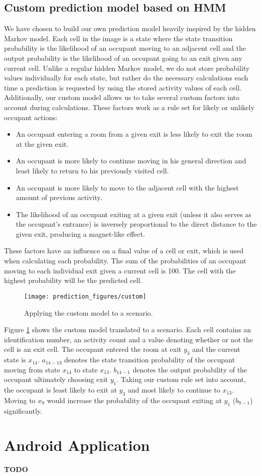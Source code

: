 \subsection{Custom prediction model based on HMM}
\label{ssub:designcustomprediction}
We have chosen to build our own prediction model heavily inspired by the hidden Markov model. Each cell in the image is a state where the state transition probability is the likelihood of an occupant moving to an adjacent cell and the output probability is the likelihood of an occupant going to an exit given any current cell. Unlike a regular hidden Markov model, we do not store probability values individually for each state, but rather do the necessary calculations each time a prediction is requested by using the stored activity values of each cell. Additionally, our custom model allows us to take several custom factors into account during calculations. These factors work as a rule set for likely or unlikely occupant actions:
\begin{itemize}
\item An occupant entering a room from a given exit is less likely to exit the room at the given exit.
\item An occupant is more likely to continue moving in his general direction and least likely to return to his previously visited cell.
\item An occupant is more likely to move to the adjacent cell with the highest amount of previous activity.
\item The likelihood of an occupant exiting at a given exit (unless it also serves as the occupant's entrance) is inversely proportional to the direct distance to the given exit, producing a magnet-like effect. 
\end{itemize}
These factors have an influence on a final value of a cell or exit, which is used when calculating each probability. The sum of the probabilities of an occupant moving to each individual exit given a current cell is 100. The cell with the highest probability will be the predicted cell.
\begin{figure}[ht]
\centering
\texttt{[image: prediction\_figures/custom]}
\caption{Applying the custom model to a scenario.}
\label{fig:custom_model}
\end{figure}

Figure \ref{fig:custom_model} shows the custom model translated to a scenario. Each cell contains an identification number, an activity count and a value denoting whether or not the cell is an exit cell. The occupant entered the room at exit \(y_3\) and the current state is \(x_{14}\). \(a_{14-13}\) denotes the state transition probability of the occupant moving from state \(x_{14}\) to state \(x_{13}\). \(b_{14-1}\) denotes the output probability of the occupant ultimately choosing exit \(y_{1}\). Taking our custom rule set into account, the occupant is least likely to exit at \(y_3\) and most likely to continue to \(x_{13}\). Moving to \(x_9\) would increase the probability of the occupant exiting at \(y_{1}\) (\(b_{9-1}\)) significantly.

\section{Android Application}
{\color[rgb]{1,0,0} \textbf{\large TODO}}